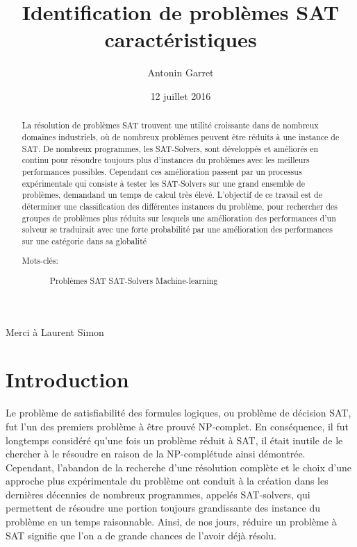 \documentclass[a4paper,11pt]{article}
\begin{document}
\title{Identification de problèmes SAT caractéristiques}%

\author{Antonin Garret}

\date{12 juillet 2016}

\maketitle

\begin{center}
Merci à Laurent Simon
\end{center}

\begin{abstract}
La résolution de problèmes SAT trouvent une utilité croissante dans de nombreux domaines industriels, où de nombreux problèmes peuvent être réduits à une instance de SAT.
De nombreux programmes, les SAT-Solvers, sont développés et améliorés en continu pour résoudre toujours plus d'instances du problèmes avec les meilleurs performances possibles. Cependant ces amélioration passent par un processus expérimentale qui consiste à tester les SAT-Solvers sur une grand ensemble de problèmes, demandand un temps de calcul très élevé.
L'objectif de ce travail est de déterminer une classification des différentes instances du problème, pour rechercher des groupes de problèmes plus réduits sur lesquels une amélioration des performances d'un solveur se traduirait avec une forte probabilité par une amélioration des performances sur une catégorie dans sa globalité
   
  \begin{description}
  \item[Mots-clés:] 
  Problèmes SAT
  SAT-Solvers
  Machine-learning

  \end{description}
\end{abstract}

\section*{Introduction}
Le problème de satisfiabilité des formules logiques, ou problème de décision SAT, fut l'un des premiers problème à être prouvé NP-complet. En conséquence, il fut longtemps considéré qu'une fois un problème réduit à SAT,
il était inutile de le chercher à le résoudre en raison de la NP-complétude ainsi démontrée. Cependant, l'abandon de la recherche d'une résolution complète et le choix d'une approche plus expérimentale du
problème ont conduit à la création dans les dernières décennies de nombreux programmes, appelés SAT-solvers, qui permettent de résoudre une portion toujours grandissante des instance du problème en un temps 
raisonnable. Ainsi, de nos jours, réduire un problème à SAT signifie que l'on a de grande chances de l'avoir déjà résolu.
\end{document}
